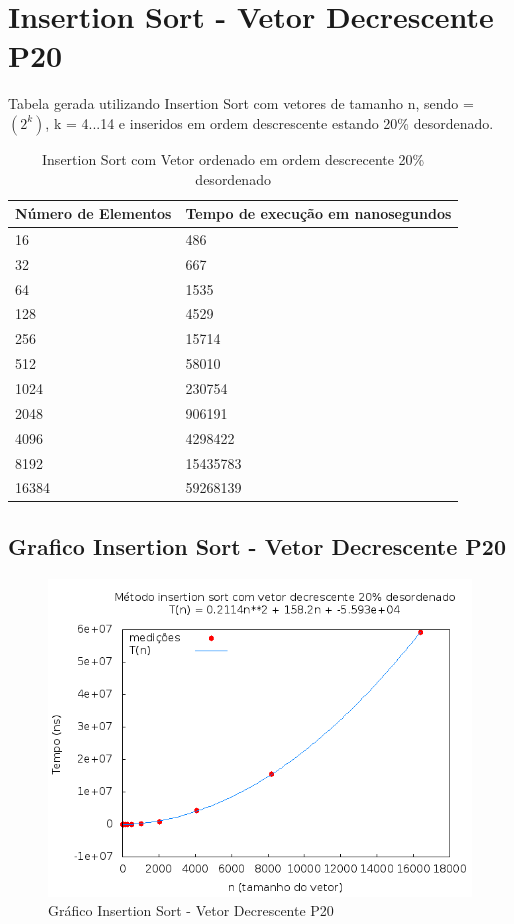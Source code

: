\documentclass[12pt,a4paper,twoside]{report}
\begin{document}
\section{Insertion Sort - Vetor Decrescente P20}
Tabela gerada utilizando Insertion Sort com vetores de tamanho n, sendo = $(2^k)$, k = 4...14 e inseridos em ordem descrescente estando 20\% desordenado.

\begin{table}[H]
\centering
\caption{Insertion Sort com Vetor ordenado em ordem descrecente 20\% desordenado}
\label{my-label}
\begin{tabular}{|l|l|}
\hline
\multicolumn{1}{|c|}{\textbf{Número de Elementos}} & \multicolumn{1}{c|}{\textbf{Tempo de execução em nanosegundos}} \\ \hline
16 & 486 \\ \hline
32 & 667 \\ \hline
64 & 1535 \\ \hline
128 & 4529 \\ \hline
256 & 15714 \\ \hline
512 & 58010 \\ \hline
1024 & 230754 \\ \hline
2048 & 906191 \\ \hline
4096 & 4298422 \\ \hline
8192 & 15435783 \\ \hline
16384 & 59268139 \\ \hline
\end{tabular}
\end{table}

\subsection{Grafico Insertion Sort - Vetor Decrescente P20}
\begin{figure}[H]
    \centering
    \includegraphics[width=0.7\linewidth]{graficos/Insertion/vIntDecrescenteP20/vIntDecrescenteP20.png}
  \caption{Gráfico Insertion Sort - Vetor Decrescente P20}
\end{figure}
\end{document}
